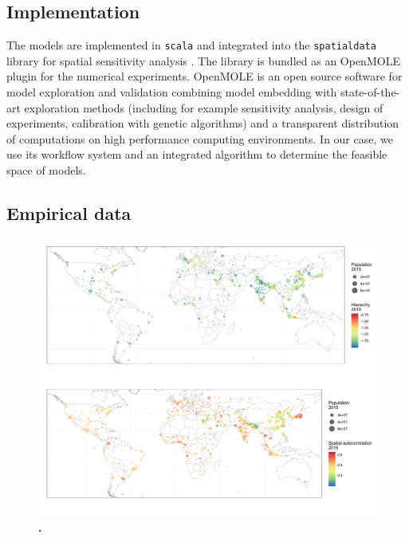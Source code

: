 \documentclass[10pt]{article}
\begin{document}
\subsection*{Implementation}

The models are implemented in \texttt{scala} and integrated into the \texttt{spatialdata} library for spatial sensitivity analysis \cite{raimbault2020scala}. The library is bundled as an OpenMOLE plugin for the numerical experiments. OpenMOLE is an open source software for model exploration and validation \cite{reuillon2013openmole} combining model embedding with state-of-the-art exploration methods (including for example sensitivity analysis, design of experiments, calibration with genetic algorithms) and a transparent distribution of computations on high performance computing environments. In our case, we use its workflow system and an integrated algorithm to determine the feasible space of models.


\subsection*{Empirical data}



\begin{figure}[!h]
	\includegraphics[width=\linewidth]{figures/Fig1.png}
	\caption{{\bf .}\label{fig:fig1}}
\end{figure}
\end{document}
